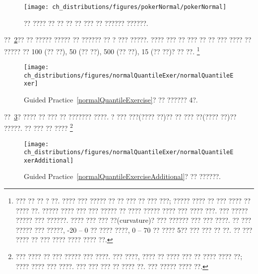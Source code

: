 \begin{figure}
\centering
\texttt{[image: ch\_distributions/figures/pokerNormal/pokerNormal]}
\caption{?? ???? ?? ?? ?? ?? ??? ?? ?????? ??????.}
\label{pokerNormal}
\end{figure}

\begin{exercise}\label{normalQuantileExercise}
??~\ref{normalQuantileExer}?? ?? ????? ????? ?? ?????? ?? ? ??? ?????. ???? ??? ?? ??? ?? ?? ??? ???? ?? ????? ?? 100 (?? ??), 50 (?? ??), 500 (?? ??), 15 (?? ??)? ?? ??.
\footnote{??? ?? ?? ? ??. 
???? ??? ????? ?? ?? ??? ?? ??? ???; ????? ???? ?? ??? ???? ?? ???? ??. ????? ???? ??? ??? ????? ?? ???? ????? ???? ??? ???? ???. ??? ????? ????? ??? ??????. ???? ??? ??? ??(curvature)? ??? ?????? ??? ??? ????. ?? ??? ????? ??? ?????, -20 -- 0 ?? ???? ????, 0 -- 70 ?? ???? 5?? ??? ??? ?? ??. ?? ??? ???? ?? ??? ???? ???? ???? ??.}
\end{exercise}

\begin{figure}
\centering
\texttt{[image: ch\_distributions/figures/normalQuantileExer/normalQuantileExer]}
\caption{Guided Practice~\ref{normalQuantileExercise}? ?? ?????? 4?.}
\label{normalQuantileExer}
\end{figure}


\begin{exercise} \label{normalQuantileExerciseAdditional}
??~\ref{normalQuantileExerAdditional}? ???? ?? ??? ?? ??????? ????. ? ??? ???(???? ??)?? ?? ??? ??(???? ??)?? ?????. ?? ??? ?? ????
\footnote{
??? ???? ?? ??? ????? ??? ????. ??? ????, ???? ?? ???? ??? ?? ???? ???? ??; ???? ???? ??? ????. ??? ??? ??? ?? ???? ??. ??? ????? ???? ??.}
\end{exercise}

\begin{figure}
\centering
\texttt{[image: ch\_distributions/figures/normalQuantileExer/normalQuantileExerAdditional]}
\caption{Guided Practice~\ref{normalQuantileExerciseAdditional}? ?? ??????.}
\label{normalQuantileExerAdditional}
\end{figure}


